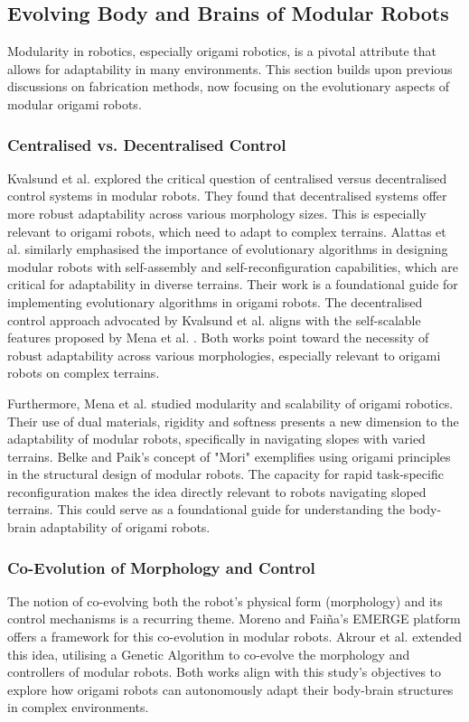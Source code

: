 \documentclass{sigchi}
\begin{document}
\subsection{Evolving Body and Brains of Modular Robots}
Modularity in robotics, especially origami robotics, is a pivotal attribute that allows for adaptability in many environments. This section builds upon previous discussions on fabrication methods, now focusing on the evolutionary aspects of modular origami robots.

\subsubsection{Centralised vs. Decentralised Control}
Kvalsund et al. explored the critical question of centralised versus decentralised control systems in modular robots. They found that decentralised systems offer more robust adaptability across various morphology sizes\cite{kvalsund_centralized_2022}. This is especially relevant to origami robots, which need to adapt to complex terrains. Alattas et al. similarly emphasised the importance of evolutionary algorithms in designing modular robots with self-assembly and self-reconfiguration capabilities, which are critical for adaptability in diverse terrains\cite{alattas_evolutionary_2019}. Their work is a foundational guide for implementing evolutionary algorithms in origami robots. The decentralised control approach advocated by Kvalsund et al. aligns with the self-scalable features proposed by Mena et al. \cite{mena_lopez_modular_2021}. Both works point toward the necessity of robust adaptability across various morphologies, especially relevant to origami robots on complex terrains.

Furthermore, Mena et al. studied modularity and scalability of origami robotics. Their use of dual materials, rigidity and softness presents a new dimension to the adaptability of modular robots, specifically in navigating slopes with varied terrains. Belke and Paik's concept of "Mori" exemplifies using origami principles in the structural design of modular robots\cite{belke_mori_2017}. The capacity for rapid task-specific reconfiguration makes the idea directly relevant to robots navigating sloped terrains. This could serve as a foundational guide for understanding the body-brain adaptability of origami robots. 



\subsubsection{Co-Evolution of Morphology and Control}
The notion of co-evolving both the robot's physical form (morphology) and its control mechanisms is a recurring theme. Moreno and Faiña's EMERGE platform offers a framework for this co-evolution in modular robots\cite{moreno_emerge_2021}. Akrour et al. extended this idea, utilising a Genetic Algorithm to co-evolve the morphology and controllers of modular robots\cite{akrour_joint_2017}. Both works align with this study's objectives to explore how origami robots can autonomously adapt their body-brain structures in complex environments.
\end{document}
